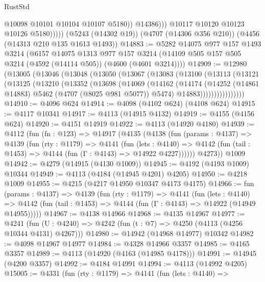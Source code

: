 \begin{lexlean}{RustStd}
\begin{coremodule}
                        @10098
                        @10101
                        @10104
                        @10107
                        @5180))
                    @14386)))
              @10117
              @10120
              @10123
              @10126
              @5180)))))
    (@5243 (@14302 @19))
    (@4707 (@14306 @356 @210))
    (@4456 (@14313 @210 @135 @1613 @1493))
@14883 := @5282
    @14075
    @977
    @157
    @1493
    @3214
    (@6157
      @14075
      @1313
      @977
      @157
      @3214
      (@14109 @505 @157 @505 @3214 (@4592 (@14114 @505)) (@4600 (@4601 @3214))))
@14909 := @12980
    (@13005
      (@13046
        (@13048
          (@13050
            (@13067
              (@13083
                (@13100
                  (@13113
                    (@13121
                      (@13125
                        (@13210
                          (@13352
                            (@13698
                              (@14069
                                (@14162
                                  (@14174
                                    (@14252 (@14861 @14883) @5462 (@4707 (@8025 @981 @5077)) @5474)
                                    @14883))))))))))))))))
@14910 := @4096 @624
@14914 := @4098 (@4102 @624) (@4108 @624)
@14915 := @4117 @10341
@14917 := @4113 (@14915 @4132)
@14919 := @4155 (@4156 @624)
@14920 := @4151 @14919
@14922 := @4113 (@14920 @4180)
@14939 := @4112
    (fun (fn : @123) =>
    @14917
      (@4135
        (@4138
          (fun (params : @4137) =>
          @4139
            (fun (rty : @1179) =>
            @4141
              (fun (lets : @4140) =>
              @4142 (fun (tail : @1453) => @4144 (fun (Γ : @4143) => @14922 @4227))))))
        @4273))
    @1009
@14942 := @4279 (@14915 (@4130 @1009))
@14945 := @4192 (@4193 @1009) @10344
@14949 := @4113 (@4184 (@14945 @4201) @4205)
@14950 := @4218 @1009
@14955 := @4215 (@4217 @14950 @10347 @4173 @4175)
@14966 := fun (params : @4137) =>
  @4139
    (fun (rty : @1179) =>
    @4141
      (fun (lets : @4140) =>
      @4142 (fun (tail : @1453) => @4144 (fun (Γ : @4143) => @14922 (@14949 @14955)))))
@14967 := @4138 @14966
@14968 := @4135 @14967
@14977 := @4241
    (fun (U : @4240) => @4242 (fun (t : @7) => @4250 (@4113 (@4256 @10344 @4131) @4267)))
@14980 := @14942 (@14968 @14977) @10342
@14982 := @4098 @14967 @14977
@14984 := @4328 @14966 @3357
@14985 := @4165 @3357
@14989 := @4113 (@14920 (@4163 (@14985 @4178)))
@14991 := @14945 (@4200 @3357)
@14992 := @4184 @14991
@14994 := @4113 (@14992 @4205)
@15005 := @4331
    (fun (rty : @1179) =>
    @4141
      (fun (lets : @4140) =>

\end{coremodule}
\end{lexlean}
